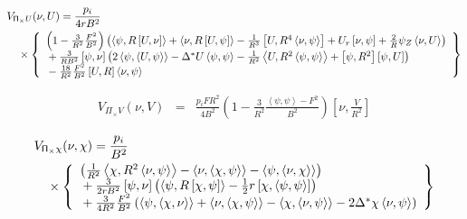 \documentclass[letterpaper]{book}
\newcommand{\tensor}[1]{\mathsf{#1}}
\renewcommand{\P}{\tensor{\Pi}}
\newcommand{\gs}[1]{\Delta^* #1}
\newcommand{\pb}[2]{\left[#1,#2\right]}
\newcommand{\ip}[2]{\left\langle  #1,#2\right\rangle}
\begin{document}
\begin{eqnarray*}
  & \lefteqn{V_{\P_\times U}(\nu, U) = \frac{p_i}{4 r B^2}} &
  \\ && \mbox{} \times 
  \left\{ \begin{array}{l}
    \left(1 - \frac{3}{R^2} \frac{F^2}{B^2} \right)
    \left( \ip{\psi}{R \pb{U}{\nu}}+\ip{\nu}{R \pb{U}{\psi}}
          -\frac{1}{R^3} \pb{U}{R^4 \ip{\nu}{\psi}}
	  +U_r \pb{\nu}{\psi} + \frac{2}{R} \psi_Z \ip{\nu}{U} \right)
    \\ \mbox{} + 
    \frac{3}{R B^2} \pb{\psi}{\nu}
    \left( 2\ip{\psi}{\ip{U}{\psi}} - \gs{U}\ip{\psi}{\psi} 
          - \frac{1}{R^2}\ip{U}{R^2\ip{\psi}{\psi}} 
	  +\pb{\psi}{R^2}\pb{\psi}{U} \right)
    \\ \mbox{} - 
    \frac{18}{R^2} \frac{F^2}{B^2} \pb{U}{R} \ip{\nu}{\psi}
  \end{array} \right\}
\end{eqnarray*}

\begin{eqnarray*}
  V_{\P_\times V}(\nu, V) & = & \frac{p_i F R^2}{4 B^2}
  \left(1 - \frac{3}{R^2} \frac{\ip{\psi}{\psi} - F^2}{B^2} \right)
    \pb{\nu}{\frac{V}{R^2}}
\end{eqnarray*}

\begin{eqnarray*}
  & \lefteqn{V_{\P_\times \chi}(\nu, \chi) = \frac{p_i}{B^2}} &
  \\ && \mbox{} \times 
  \left\{ \begin{array}{l}
    \left( \frac{1}{R^2}\ip{\chi}{R^2 \ip{\nu}{\psi}}
          -\ip{\nu}{\ip{\chi}{\psi}} - \ip{\psi}{\ip{\nu}{\chi}} \right)
    \\ \mbox{} + \frac{3}{2 r B^2} \pb{\psi}{\nu}
    \left( \ip{\psi}{R \pb{\chi}{\psi}} 
         - \frac{1}{2} r \pb{\chi}{\ip{\psi}{\psi}} \right)
    \\ \mbox{} + \frac{3}{4 R^2} \frac{F^2}{B^2}
    \left( \ip{\psi}{\ip{\chi}{\nu}} + \ip{\nu}{\ip{\chi}{\psi}}
          -\ip{\chi}{\ip{\nu}{\psi}} - 2 \gs{\chi}\ip{\nu}{\psi} \right)
  \end{array} \right\}
\end{eqnarray*}
\end{document}
